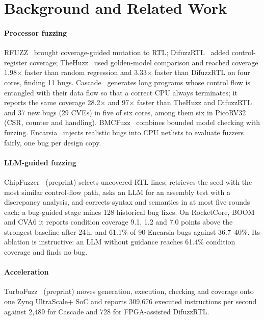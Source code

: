 \documentclass[conference,10pt]{IEEEtran}
\newcommand{\code}[1]{\texttt{\detokenize{#1}}}
\begin{document}
\section{Background and Related Work}\label{sec:background}
\paragraph*{Processor fuzzing} RFUZZ~\cite{rfuzz} brought coverage-guided mutation to RTL; DifuzzRTL~\cite{difuzzrtl} added
control-register coverage; TheHuzz~\cite{thehuzz} used golden-model comparison and reached coverage 1.98$\times$ faster than random
regression and 3.33$\times$ faster than DifuzzRTL on four cores, finding 11 bugs. Cascade~\cite{cascade} generates long programs whose
control flow is entangled with their data flow so that a correct CPU always terminates; it reports the same coverage 28.2$\times$ and
97$\times$ faster than TheHuzz and DifuzzRTL and 37 new bugs (29 CVEs) in five of six cores, among them six in PicoRV32 (CSR, counter
and \code{fence} handling). BMCFuzz~\cite{bmcfuzz} combines bounded model checking with fuzzing. Encarsia~\cite{encarsia} injects
realistic bugs into CPU netlists to evaluate fuzzers fairly, one bug per design copy.

\paragraph*{LLM-guided fuzzing} ChipFuzzer~\cite{chipfuzzer} (preprint) selects uncovered RTL lines, retrieves the seed with the most
similar control-flow path, asks an LLM for an assembly test with a discrepancy analysis, and corrects syntax and semantics in at most five
rounds each; a bug-guided stage mines 128 historical bug fixes. On RocketCore, BOOM and CVA6 it reports condition coverage 9.1, 1.2 and
7.0 points above the strongest baseline after 24\,h, and 61.1\% of 90 Encarsia bugs against 36.7--40\%. Its ablation is instructive: an
LLM without guidance reaches 61.4\% condition coverage and finds no bug.

\paragraph*{Acceleration} TurboFuzz~\cite{turbofuzz} (preprint) moves generation, execution, checking and coverage onto one Zynq
UltraScale+ SoC and reports 309{,}676 executed instructions per second against 2{,}489 for Cascade and 728 for FPGA-assisted DifuzzRTL.
\end{document}
